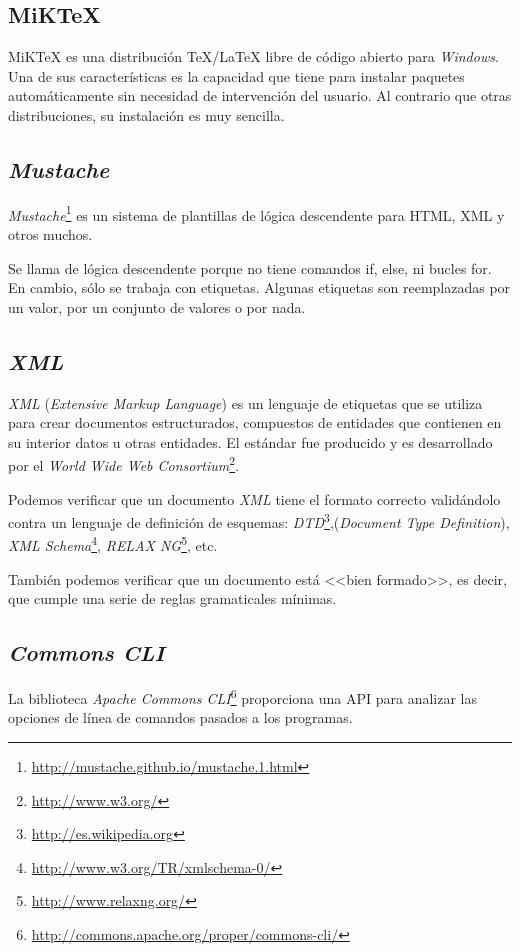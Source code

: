 \subsection{MiK\TeX{}}
MiK\TeX{} es una distribución \TeX{}/\LaTeX{} libre de código abierto para \textit{Windows}.
Una de sus características es la capacidad que tiene para instalar paquetes automáticamente sin necesidad de intervención del usuario. Al contrario que otras distribuciones, su instalación es muy sencilla.

\subsection{\textit{Mustache}}
\textit{Mustache}\footnote{\url{http://mustache.github.io/mustache.1.html}} es un sistema de plantillas de lógica descendente para HTML, XML y otros muchos.

Se llama de lógica descendente porque no tiene comandos if, else, ni bucles for. En cambio, sólo se trabaja con etiquetas.
Algunas etiquetas son reemplazadas por un valor, por un conjunto de valores o por nada.

\subsection{\textit{XML}}
\emph{XML} (\emph{Extensive Markup Language}) es un lenguaje de etiquetas que se utiliza para crear documentos estructurados, compuestos de entidades que contienen en su interior datos u otras entidades.
El estándar fue producido y es desarrollado por el \emph{World Wide Web Consortium}\footnote{\url{http://www.w3.org/}}.

Podemos verificar que un documento \emph{XML} tiene el formato correcto validándolo contra un lenguaje de definición de esquemas: \textit{DTD}\footnote{\url{http://es.wikipedia.org}},(\emph{Document Type Definition}), \emph{XML Schema}\footnote{\url{http://www.w3.org/TR/xmlschema-0/}}, \textit{RELAX NG}\footnote{\url{http://www.relaxng.org/}}, etc.

También podemos verificar que un documento está <<bien formado>>, es decir, que cumple una serie de reglas gramaticales mínimas.

\subsection{\textit{Commons CLI}}
La biblioteca \textit{Apache Commons CLI}\footnote{\url{http://commons.apache.org/proper/commons-cli/}} proporciona una API para analizar las opciones de línea de comandos pasados a los programas.

